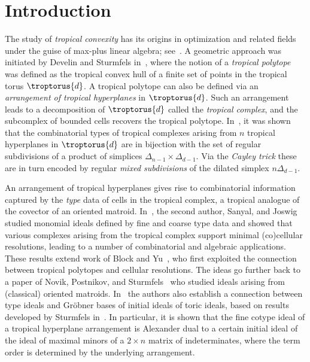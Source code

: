 \section{Introduction}
The study of \emph{tropical convexity} has its origins in optimization and related fields under the guise of max-plus linear algebra; 
see~\cite{butkovic, cohen+gaubert+quadrat, litvinov+maslov+shpiz}.
A geometric approach was initiated by Develin and Sturmfels in~\cite{develin2004tropical}, where the notion of a \emph{tropical polytope} was defined as the tropical convex hull of a finite set of points in the tropical torus $\troptorus{d}$.
A tropical polytope can also be defined via an \emph{arrangement of tropical hyperplanes} in $\troptorus{d}$.  Such an arrangement leads to a decomposition of $\troptorus{d}$ called the \emph{tropical complex}, and the subcomplex of bounded cells recovers the tropical polytope. In~\cite{develin2004tropical}, it was shown that the combinatorial types of tropical complexes arising from $n$ tropical hyperplanes in $\troptorus{d}$ are in bijection with the set of regular subdivisions of a product of simplices $\Delta_{n-1} \times \Delta_{d-1}$. Via the \emph{Cayley trick} these are in turn encoded by regular \emph{mixed subdivisions} of the dilated simplex $n \Delta_{d-1}$.


An arrangement of tropical hyperplanes gives rise to  combinatorial information captured by the \emph{type} data of cells in the tropical complex, a tropical analogue of the covector of an oriented matroid. 
In~\cite{dochtermann2012tropical}, the second author, Sanyal, and Joswig studied monomial ideals defined by fine and coarse type data and showed that various complexes arising from the tropical complex support minimal (co)cellular resolutions, leading to a number of combinatorial and algebraic applications. 
These results extend work of Block and Yu~\cite{block2006tropical}, who first exploited the connection between tropical polytopes and cellular resolutions. The ideas go further back to a paper of Novik, Postnikov, and Sturmfels~\cite{NPS} who studied ideals arising from (classical) oriented matroids.
In~\cite{block2006tropical} the authors also establish a connection between type ideals and Gr\"obner bases of initial ideals of toric ideals, based on results developed by Sturmfels in~\cite{sturmfels1996grobner}.  In particular, it is shown that the fine cotype ideal of a tropical hyperplane arrangement is Alexander dual to a certain initial ideal of the ideal of maximal minors of a $2 \times n$ matrix of indeterminates, where the term order is determined by the underlying arrangement.   

